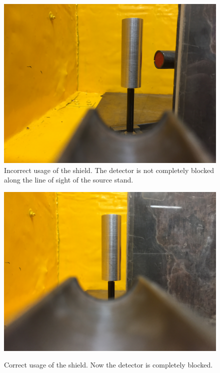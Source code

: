 \documentclass{../lab}
\begin{document}
\begin{enumerate}
\begin{figure}[!h]
\begin{minipage}{.49\linewidth}
    \centering
    \href{http://experimentationlab.berkeley.edu/sites/default/files/upimages/Detector-Exposed.JPG}{\includegraphics[width=\linewidth,keepaspectratio]{images/Detector-Exposed.JPG}} \\
    \caption{Incorrect usage of the shield. The detector is not completely blocked along the line of sight of the source stand.}
    \label{fig:IncorrectShield}
\end{minipage}\hfill
\begin{minipage}{.49\linewidth}
    \centering
    \href{http://experimentationlab.berkeley.edu/sites/default/files/upimages/Detector-Shielded.JPG}{\includegraphics[width=\linewidth,keepaspectratio]{images/Detector-Shielded.JPG}} \\
    \caption{Correct usage of the shield. Now the detector is completely blocked.}
    \label{fig:CorrectShield}
\end{minipage} 
\end{figure}  


\end{enumerate}
\end{document}
